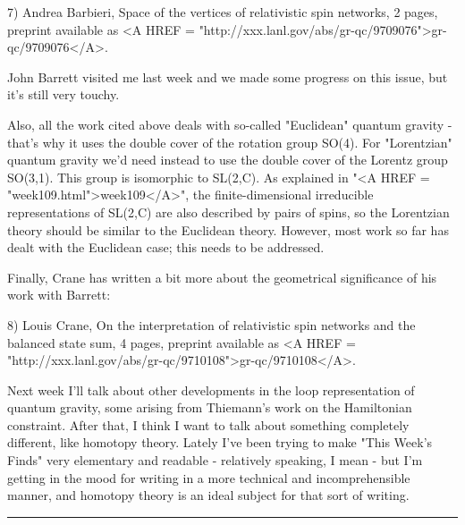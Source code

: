 7) Andrea Barbieri, Space of the vertices of relativistic spin networks,
2 pages, preprint available as <A HREF = "http://xxx.lanl.gov/abs/gr-qc/9709076">gr-qc/9709076</A>.  

John Barrett visited me last week and we made some progress on this
issue, but it's still very touchy.

Also, all the work cited above deals with so-called "Euclidean" quantum
gravity - that's why it uses the double cover of the rotation group
SO(4).  For "Lorentzian" quantum gravity we'd need instead to use the
double cover of the Lorentz group SO(3,1).  This group is isomorphic to
SL(2,C).  As explained in "<A HREF = "week109.html">week109</A>", the finite-dimensional irreducible
representations of SL(2,C) are also described by pairs of spins, so the
Lorentzian theory should be similar to the Euclidean theory.  However,
most work so far has dealt with the Euclidean case; this needs to be
addressed.

Finally, Crane has written a bit more about the geometrical significance of
his work with Barrett:

8) Louis Crane, On the interpretation of relativistic spin networks and
the balanced state sum, 4 pages, preprint available as <A HREF = "http://xxx.lanl.gov/abs/gr-qc/9710108">gr-qc/9710108</A>.

Next week I'll talk about other developments in the loop representation
of quantum gravity, some arising from Thiemann's work on the Hamiltonian
constraint.  After that, I think I want to talk about something
completely different, like homotopy theory.  Lately I've been trying to 
make "This Week's Finds" very elementary and readable - relatively
speaking, I mean - but I'm getting in the mood for writing in a more
technical and incomprehensible manner, and homotopy theory is an ideal
subject for that sort of writing.





 \par\noindent\rule{\textwidth}{0.4pt}

